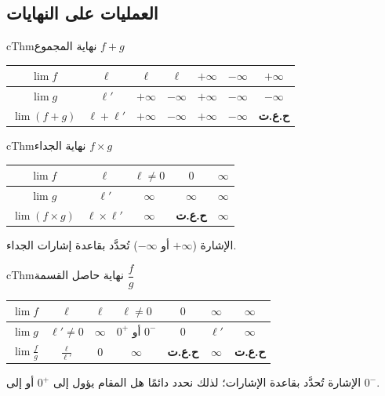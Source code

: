 \documentclass[12pt,a4paper]{article}
\newenvironment{BOX}[2]{\begin{otherlanguage}{english}\begin{arbox}{#1}{#2}}{\end{arbox}\end{otherlanguage}}
\newenvironment{khassia}[1][خاصية]{\begin{BOX}{cThm}{#1}}{\end{BOX}}
\begin{document}
\subsection{العمليات على النهايات}
\begin{khassia}[نهاية المجموع $f+g$]
\begin{center}\renewcommand{\arraystretch}{1.3}
\begin{tabular}{|c|C|C|C|C|C|C|}\hline
{}$\lim f$ & $\ell$ & $\ell$ & $\ell$ & $+\infty$ & $-\infty$ & $+\infty$\\\hline
$\lim g$ & $\ell'$ & $+\infty$ & $-\infty$ & $+\infty$ & $-\infty$ & $-\infty$\\\hline
$\lim (f+g)$ & $\ell+\ell'$ & $+\infty$ & $-\infty$ & $+\infty$ & $-\infty$ & \textbf{ح.ع.ت}\\\hline
\end{tabular}\end{center}
\end{khassia}
\begin{khassia}[نهاية الجداء $f\times g$]
\begin{center}\renewcommand{\arraystretch}{1.3}
\begin{tabular}{|c|C|C|C|C|}\hline
{}$\lim f$ & $\ell$ & $\ell\neq0$ & $0$ & $\infty$\\\hline
$\lim g$ & $\ell'$ & $\infty$ & $\infty$ & $\infty$\\\hline
$\lim (f\times g)$ & $\ell\times\ell'$ & $\infty$ & \textbf{ح.ع.ت} & $\infty$\\\hline
\end{tabular}\end{center}
الإشارة ($+\infty$ أو $-\infty$) تُحدَّد بقاعدة إشارات الجداء.
\end{khassia}
\begin{khassia}[نهاية حاصل القسمة $\dfrac{f}{g}$]
\begin{center}\renewcommand{\arraystretch}{1.3}
\begin{tabular}{|c|C|C|C|C|C|C|}\hline
{}$\lim f$ & $\ell$ & $\ell$ & $\ell\neq0$ & $0$ & $\infty$ & $\infty$\\\hline
$\lim g$ & $\ell'\neq0$ & $\infty$ & $0^{+}$ أو $0^{-}$ & $0$ & $\ell'$ & $\infty$\\\hline
$\lim \frac{f}{g}$ & $\frac{\ell}{\ell'}$ & $0$ & $\infty$ & \textbf{ح.ع.ت} & $\infty$ & \textbf{ح.ع.ت}\\\hline
\end{tabular}\end{center}
الإشارة تُحدَّد بقاعدة الإشارات؛ لذلك نحدد دائمًا هل المقام يؤول إلى $0^{+}$ أو إلى $0^{-}$.
\end{khassia}
\end{document}

